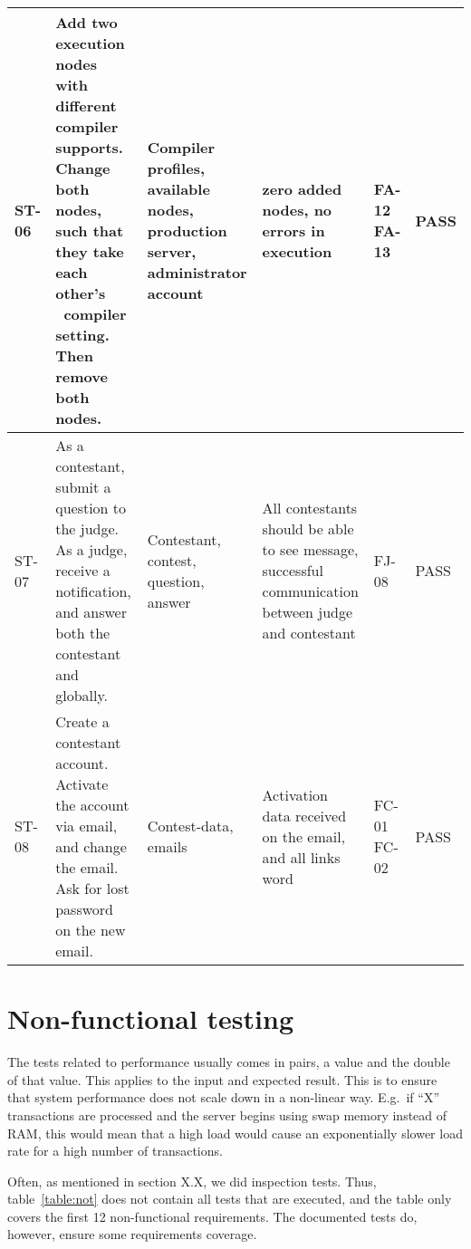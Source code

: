 \begin{longtable}{|l|p{3cm}|p{3cm}|p{3cm}|p{1.1cm}|l|}
ST-06 & Add two execution nodes with different compiler supports. Change both
nodes, such that they take each other's \ compiler setting. Then remove both
nodes. &
Compiler profiles, available nodes, production server, administrator account &
zero added nodes, no errors in execution & FA-12 FA-13 & PASS\\
\hline 

ST-07 & As a contestant, submit a question to the judge. As a judge, receive a
notification, and answer both the contestant and globally. &
Contestant, contest, question, answer &
All contestants should be able to see message, successful communication between
judge and contestant & FJ-08 & PASS\\
\hline

ST-08 & Create a contestant account. Activate the account via email, and change
the email. Ask for lost password on the new  email. &
Contest-data, emails & Activation data received on the email, and all links
word & FC-01 FC-02 & PASS\\
\hline
\end{longtable}

\pagebreak
\section{Non-functional testing}

The tests related to performance usually comes in pairs, a value and the
double of that value. This applies to the input and expected result.
This is to ensure that system performance does not scale down in a
non-linear way. E.g.\ if ``X''
transactions are processed and the server begins using swap memory
instead of RAM, this would mean that a high load would cause an
exponentially slower load rate for a high number of transactions.

Often, as mentioned in section X.X, we did
inspection tests. Thus, table~\ref{table:not} does not contain all tests that
are executed, and the table only covers the first 12 non-functional
requirements. The documented tests do, however, ensure some
requirements coverage.

